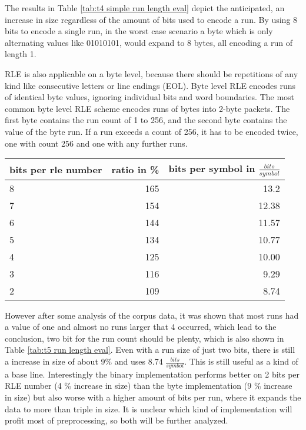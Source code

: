 \par{
The results in Table \ref{tab:t4 simple run length eval} depict the anticipated, an increase in size regardless of the amount of bits used to encode a run. By using 8 bits to encode a single run, in the worst case scenario a byte which is only alternating values like 01010101, would expand to 8 bytes, all encoding a run of length 1.
}

\par{
RLE is also applicable on a byte level, because there should be repetitions of any kind like consecutive letters or line endings (EOL). Byte level RLE encodes runs of identical byte values, ignoring individual bits and word boundaries. The most common byte level RLE scheme encodes runs of bytes into 2-byte packets. The first byte contains the run count of 1 to 256, and the second byte contains the value of the byte run. If a run exceeds a count of 256, it has to be encoded twice, one with count 256 and one with any further runs.
}

\begin{center}
	\begin{tabular}[p]{l|r|r}
		\label{tab:t5 run length eval}
		
		bits per rle number &  ratio in \% & bits per symbol in $\frac{bits}{symbol}$\\
		\hline
		8 & 165 & 13.2 \\
		7 & 154 & 12.38\\
		6 & 144 & 11.57 \\
		5 & 134 & 10.77\\
		4 & 125 & 10.00\\
		3 & 116 & 9.29\\
		2 & 109 & 8.74 \\
	\end{tabular}
\end{center}


\par{
 However after some analysis of the corpus data, it was shown that most runs had a value of one and almost no runs larger that 4 occurred, which lead to the conclusion, two bit for the run count should be plenty, which is also shown in Table \ref{tab:t5 run length eval}.
 Even with a run size of just two bits, there is still a increase in size of about 9\% and uses 8.74 $\frac{bits}{symbol}$. This is still useful as a kind of a base line.
Interestingly the binary implementation performs better on 2 bits per RLE number (4 \% increase in size) than the byte implementation (9 \% increase in size) but also worse with a higher amount of bits per run, where it expands the data to more than triple in size. It is unclear which kind of implementation will profit most of preprocessing, so both will be further analyzed.
}

